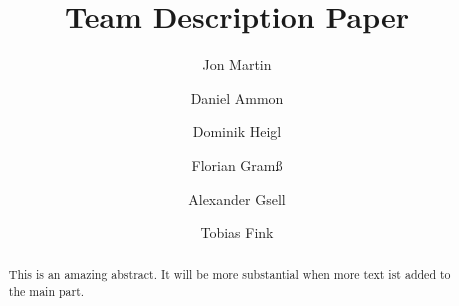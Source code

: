 \documentclass[runningheads,a4paper]{llncs}
\begin{document}
\mainmatter  %

\title{Team Description Paper}


%
%
\author{Jon Martin
\and Daniel Ammon\and Dominik Heigl\and Florian Gram{\ss} \and Alexander Gsell\\
\and Tobias Fink
}



%
%

\maketitle


\begin{abstract}
This is an amazing abstract. It will be more substantial when more text ist added to the main part.
\end{abstract}
\end{document}
